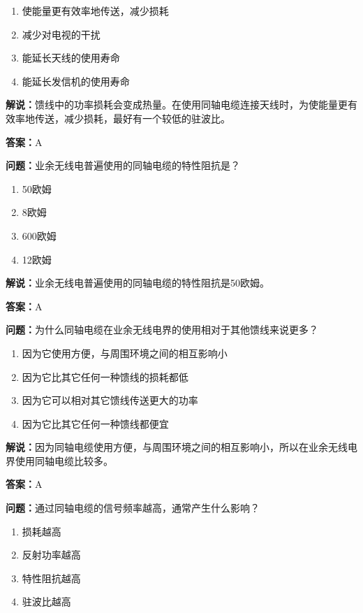 \documentclass[UTF8]{ctexbook}
\begin{document}
\begin{enumerate}[label=\Alph*), leftmargin=3em]
  \item 使能量更有效率地传送，减少损耗
  \item 减少对电视的干扰
  \item 能延长天线的使用寿命
  \item 能延长发信机的使用寿命
\end{enumerate}

\textbf{解说：}馈线中的功率损耗会变成热量。在使用同轴电缆连接天线时，为使能量更有效率地传送，减少损耗，最好有一个较低的驻波比。%

\textbf{答案：}A

\textbf{问题：}业余无线电普遍使用的同轴电缆的特性阻抗是？

\begin{enumerate}[label=\Alph*), leftmargin=3em]
  \item 50欧姆
  \item 8欧姆
  \item 600欧姆
  \item 12欧姆
\end{enumerate}

\textbf{解说：}业余无线电普遍使用的同轴电缆的特性阻抗是50欧姆。%

\textbf{答案：}A

\textbf{问题：}为什么同轴电缆在业余无线电界的使用相对于其他馈线来说更多？

\begin{enumerate}[label=\Alph*), leftmargin=3em]
  \item 因为它使用方便，与周围环境之间的相互影响小
  \item 因为它比其它任何一种馈线的损耗都低
  \item 因为它可以相对其它馈线传送更大的功率
  \item 因为它比其它任何一种馈线都便宜
\end{enumerate}

\textbf{解说：}因为同轴电缆使用方便，与周围环境之间的相互影响小，所以在业余无线电界使用同轴电缆比较多。%

\textbf{答案：}A

\textbf{问题：}通过同轴电缆的信号频率越高，通常产生什么影响？

\begin{enumerate}[label=\Alph*), leftmargin=3em]
  \item 损耗越高
  \item 反射功率越高
  \item 特性阻抗越高
  \item 驻波比越高
\end{enumerate}
\end{document}
